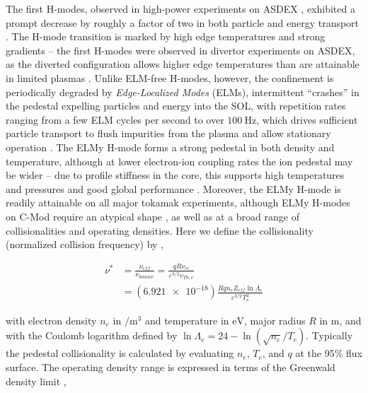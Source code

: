 The first H-modes, observed in high-power experiments on ASDEX \cite{Wagner1982,Keilhacker1984}, exhibited a prompt decrease by roughly a factor of two in both particle and energy transport \cite{Wagner1982}.  The H-mode transition is marked by high edge temperatures and strong gradients -- the first H-modes were observed in divertor experiments on ASDEX, as the diverted configuration allows higher edge temperatures than are attainable in limited plasmas \cite{Keilhacker1984}.  Unlike ELM-free H-modes, however, the confinement is periodically degraded by \emph{Edge-Localized Modes} (ELMs), intermittent ``crashes'' in the pedestal expelling particles and energy into the SOL, with repetition rates ranging from a few ELM cycles per second to over $\SI{100}{\hertz}$, which drives sufficient particle transport to flush impurities from the plasma and allow stationary operation \cite{Keilhacker1984,Zohm1996}.  The ELMy H-mode forms a strong pedestal in both density and temperature, although at lower electron-ion 
coupling rates the ion pedestal may be wider \cite{Groebner1998a} -- due to profile stiffness in the core, this supports high temperatures and pressures and good global performance \cite{Greenwald1997,Suttrop2000,Schneider2013}.  Moreover, the ELMy H-mode is readily attainable on all major tokamak experiments, although ELMy H-modes on C-Mod require an atypical shape \cite{Hughes2012,Hughes2013}, as well as at a broad range of collisionalities and operating densities.  Here we define the collisionality (normalized collision frequency) by \cite{Sauter1999},

\begin{equation}\label{eq:nustar}
 \begin{aligned}
 \nu^* &= \frac{\nu_{eff}}{\nu_{bounce}} = \frac{qR\nu_{ei}}{\varepsilon^{3/2} v_{Th,e}}\\ &= \left(\num{6.921e-18}\right) \frac{Rqn_e Z_{eff} \ln \Lambda_e}{\varepsilon^{3/2} T_e^2}
 \end{aligned}
\end{equation}

\noindent with electron density $n_e$ in $\si{\per\meter\cubed}$ and temperature in $\si{\electronvolt}$, major radius $R$ in $\si{\meter}$, and with the Coulomb logarithm defined by $\ln \Lambda_e = 24 - \ln\left(\sqrt{n_e}/T_e\right)$.  Typically the pedestal collisionality is calculated by evaluating $n_e$, $T_e$, and $q$ at the 95\% flux surface.  The operating density range is expressed in terms of the Greenwald density limit \cite{Greenwald1988},

